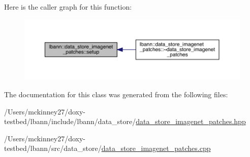 Here is the caller graph for this function\+:\nopagebreak
\begin{figure}[H]
\begin{center}
\leavevmode
\includegraphics[width=350pt]{classlbann_1_1data__store__imagenet__patches_aa8cfaf12c87f3dbbbb4fc808f6ca26ad_icgraph}
\end{center}
\end{figure}


The documentation for this class was generated from the following files\+:\begin{DoxyCompactItemize}
\item 
/\+Users/mckinney27/doxy-\/testbed/lbann/include/lbann/data\+\_\+store/\hyperlink{data__store__imagenet__patches_8hpp}{data\+\_\+store\+\_\+imagenet\+\_\+patches.\+hpp}\item 
/\+Users/mckinney27/doxy-\/testbed/lbann/src/data\+\_\+store/\hyperlink{data__store__imagenet__patches_8cpp}{data\+\_\+store\+\_\+imagenet\+\_\+patches.\+cpp}\end{DoxyCompactItemize}
